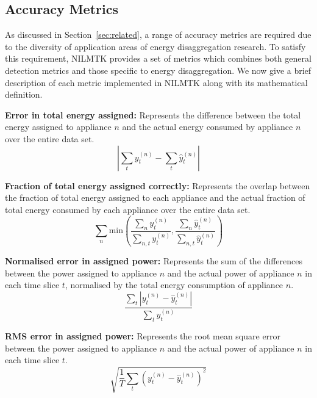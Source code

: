 \documentclass{sig-alternate}
\newcommand{\secref}[1]{Section~\ref{#1}}
\begin{document}
\subsection{Accuracy Metrics}
\label{sec:metrics}

\noindent
As discussed in \secref{sec:related}, a range of accuracy metrics are required due to the diversity of application areas of energy disaggregation research. To satisfy this requirement, NILMTK provides a set of metrics which combines both general detection metrics and those specific to energy disaggregation. We now give a brief description of each metric implemented in NILMTK along with its mathematical definition.

\textbf{Error in total energy assigned:} Represents the difference between the total energy assigned to appliance $n$ and the actual energy consumed by appliance $n$ over the entire data set.
\begin{equation}
        \left | \sum_t y^{(n)}_t - \sum_t \hat{y}^{(n)}_t \right |
\end{equation}

\textbf{Fraction of total energy assigned correctly:} Represents the overlap between the fraction of total energy assigned to each appliance and the actual fraction of total energy consumed by each appliance over the entire data set.
\begin{equation}
        \sum_n \mathrm{min} \left ( 
        \frac{\sum_n y^{(n)}_t}{\sum_{n,t} y^{(n)}_t}, 
        \frac{\sum_n \hat{y}^{(n)}_t}{\sum_{n,t} \hat{y}^{(n)}_t} 
        \right )
\end{equation}

\textbf{Normalised error in assigned power:} Represents the sum of the differences between the power assigned to appliance $n$ and the actual power of appliance $n$ in each time slice $t$, normalised by the total energy consumption of appliance $n$.
\begin{equation}
        \frac
        { \sum_t {\left | y_t^{(n)} - \hat{y}_t^{(n)} \right |} }
        { \sum_t y_t^{(n)} }
\end{equation}

\textbf{RMS error in assigned power:} Represents the root mean square error between the power assigned to appliance $n$ and the actual power of appliance $n$ in each time slice $t$.
\begin{equation}
\sqrt{ \frac{1}{T} \sum_t{ \left ( y^{(n)}_t - \hat{y}^{(n)}_t \right )^2 } }
\end{equation}
\end{document}
